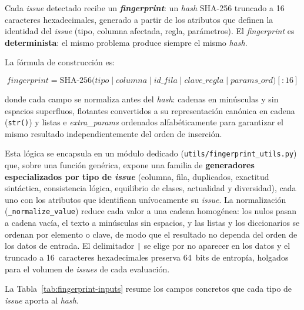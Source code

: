 Cada \emph{issue} detectado recibe un \textbf{\emph{fingerprint}}: un
\emph{hash} \ac{SHA}-256 truncado a 16 caracteres hexadecimales, generado a
partir de los atributos que definen la identidad del \emph{issue} (tipo,
columna afectada, regla, parámetros).  El \emph{fingerprint} es
\textbf{determinista}: el mismo problema produce siempre el mismo \emph{hash}.

La fórmula de construcción es:

\begin{equation*}
  \mathit{fingerprint} =
    \mathrm{SHA\text{-}256}\!\bigl(
      \mathit{tipo} \mathbin{|} \mathit{columna} \mathbin{|}
      \mathit{id\_fila} \mathbin{|} \mathit{clave\_regla} \mathbin{|}
      \mathit{params\_ord}
    \bigr)[{:}16]
\end{equation*}

\noindent donde cada campo se normaliza antes del \emph{hash}: cadenas en
minúsculas y sin espacios superfluos, flotantes convertidos a su
representación canónica en cadena (\texttt{str()}) y listas e
\emph{extra\_params} ordenados alfabéticamente para garantizar el mismo
resultado independientemente del orden de inserción.

Esta lógica se encapsula en un módulo dedicado
(\texttt{utils/fingerprint\_utils.py}) que, sobre una función genérica, expone
una familia de \textbf{generadores especializados por tipo de \emph{issue}}
(columna, fila, duplicados, exactitud sintáctica, consistencia lógica,
equilibrio de clases, actualidad y diversidad), cada uno con los atributos que
identifican unívocamente su \emph{issue}.  La normalización
(\texttt{\_normalize\_value}) reduce cada valor a una cadena homogénea: los
nulos pasan a cadena vacía, el texto a minúsculas sin espacios, y las listas y
los diccionarios se ordenan por elemento o clave, de modo que el resultado no
dependa del orden de los datos de entrada.  El delimitador \texttt{|} se elige
por no aparecer en los datos y el truncado a 16~caracteres hexadecimales
preserva 64~bits de entropía, holgados para el volumen de \emph{issues} de cada
evaluación.

La Tabla~\ref{tab:fingerprint-inputs} resume los campos concretos que
cada tipo de \emph{issue} aporta al \emph{hash}.

